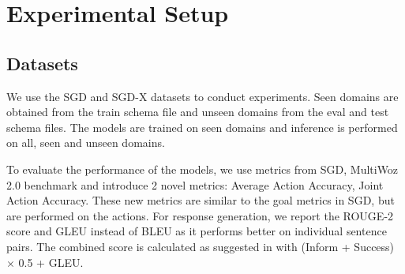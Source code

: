\section{Experimental Setup}


\subsection{Datasets}

We use the SGD \citep{rastogi2020towards} and SGD-X \citep{lee2022sgd} datasets to conduct experiments.
Seen domains are obtained from the train schema file and unseen domains from the eval and test schema files.
The models are trained on seen domains and inference is performed on all, seen and unseen domains.

To evaluate the performance of the models, we use metrics from SGD, MultiWoz 2.0 benchmark \citep{ramadan2018large} and introduce 2 novel metrics: Average Action Accuracy, Joint Action Accuracy.
These new metrics are similar to the goal metrics in SGD, but are performed on the actions.
For response generation, we report the ROUGE-2 \citep{lin2004looking} score and GLEU \citep{wu2016googles} instead of BLEU as it performs better on individual sentence pairs.
The combined score is calculated as suggested in \citep{mehri2019structured} with (Inform + Success) $\times$ 0.5 + GLEU.